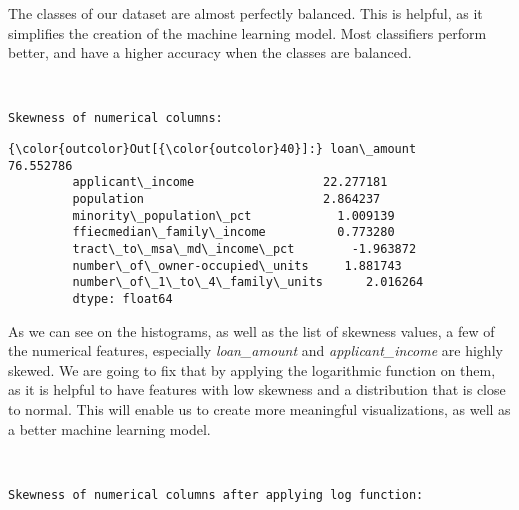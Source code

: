 \documentclass[11pt]{article}
\begin{document}
    The classes of our dataset are almost perfectly balanced. This is
helpful, as it simplifies the creation of the machine learning model. 
Most classifiers perform better, and have a higher accuracy when the classes are balanced.

    \begin{center}
    \end{center}
    { \hspace*{\fill} \\}
    
    \begin{Verbatim}[commandchars=\\\{\}]
Skewness of numerical columns:

    \end{Verbatim}

\begin{Verbatim}[commandchars=\\\{\}]
{\color{outcolor}Out[{\color{outcolor}40}]:} loan\_amount                       76.552786
         applicant\_income                  22.277181
         population                         2.864237
         minority\_population\_pct            1.009139
         ffiecmedian\_family\_income          0.773280
         tract\_to\_msa\_md\_income\_pct        -1.963872
         number\_of\_owner-occupied\_units     1.881743
         number\_of\_1\_to\_4\_family\_units      2.016264
         dtype: float64
\end{Verbatim}
            
    As we can see on the histograms, as well as the list of skewness values,
a few of the numerical features, especially \emph{loan\_amount} and
\emph{applicant\_income} are highly skewed. We are going to fix that by
applying the logarithmic function on them, as it is helpful to have
features with low skewness and a distribution that is close to normal.
This will enable us to create more meaningful visualizations, as well as
a better machine learning model.

    \begin{center}
    \end{center}
    { \hspace*{\fill} \\}
    
    \begin{Verbatim}[commandchars=\\\{\}]
Skewness of numerical columns after applying log function:

    \end{Verbatim}
\end{document}
